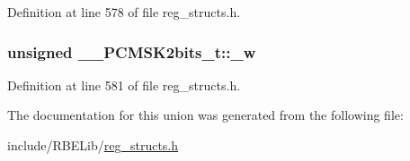 Definition at line 578 of file reg\+\_\+structs.\+h.

\hypertarget{union_____p_c_m_s_k2bits__t_a1b7fc3ec4cf59e51917cf7dacc3833a5}{
\subsubsection[{\+\_\+w}]{\setlength{\rightskip}{0pt plus 5cm}unsigned \+\_\+\+\_\+\+P\+C\+M\+S\+K2bits\+\_\+t\+::\+\_\+w}}\label{union_____p_c_m_s_k2bits__t_a1b7fc3ec4cf59e51917cf7dacc3833a5}


Definition at line 581 of file reg\+\_\+structs.\+h.



The documentation for this union was generated from the following file\+:\begin{DoxyCompactItemize}
\item 
include/\+R\+B\+E\+Lib/\hyperlink{reg__structs_8h}{reg\+\_\+structs.\+h}\end{DoxyCompactItemize}
